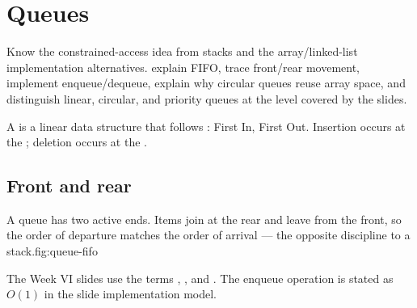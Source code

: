 \chapter{Queues}\label{ch:queues}

\chapterguide%
  {Know the constrained-access idea from stacks and the array/linked-list implementation alternatives.}
  {explain FIFO, trace front/rear movement, implement enqueue/dequeue, explain why circular queues reuse array space, and distinguish linear, circular, and priority queues at the level covered by the slides.}

A  is a linear data structure that follows : First In, First Out. Insertion occurs at the ; deletion occurs at the .

\section{Front and rear}

\begin{utpfig}{A queue has two active ends. Items join at the rear and leave from the
front, so the order of departure matches the order of arrival --- the opposite discipline
to a stack.}{fig:queue-fifo}
\end{utpfig}

The Week VI slides use the terms , , and . The enqueue operation is stated as $O(1)$ in the slide implementation model.

